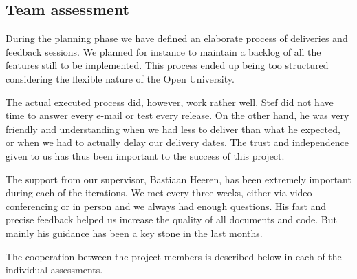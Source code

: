 
\subsection{Team assessment}
\label{assessment:team}
During the planning phase we have defined an elaborate process of deliveries and feedback sessions.
We planned for instance to maintain a backlog of all the features still to be implemented.
This process ended up being too structured considering the flexible nature of the Open University.

The actual executed process did, however, work rather well.
Stef did not have time to answer every e-mail or test every release.
On the other hand, he was very friendly and understanding when we had less to deliver than what he expected, or when we had to actually delay our delivery dates.
The trust and independence given to us has thus been important to the success of this project.

The support from our supervisor, Bastiaan Heeren, has been extremely important during each of the iterations.
We met every three weeks, either via video-conferencing or in person and we always had enough questions.
His fast and precise feedback helped us increase the quality of all documents and code.
But mainly his guidance has been a key stone in the last months.

The cooperation between the project members is described below in each of the individual assessments.

